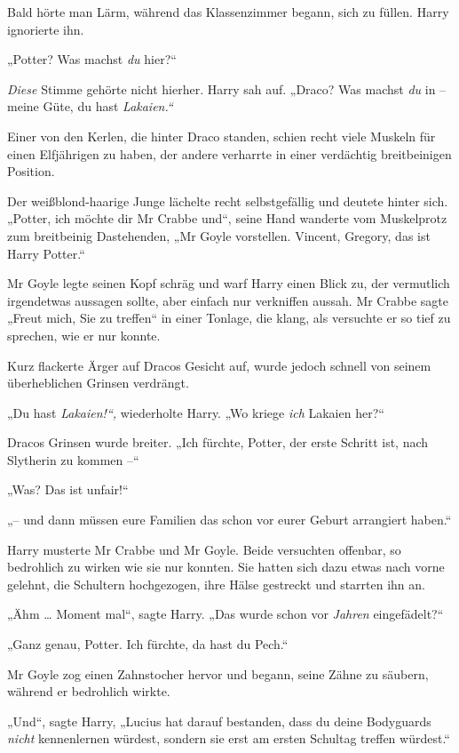 {Bald hörte man Lärm, während das Klassenzimmer begann, sich zu füllen. Harry ignorierte ihn.

„Potter? Was machst \emph{du} hier?“

\emph{Diese} Stimme gehörte nicht hierher. Harry sah auf. „Draco? Was machst \emph{du} in -- meine Güte, du hast \emph{Lakaien.“}

Einer von den Kerlen, die hinter Draco standen, schien recht viele Muskeln für einen Elfjährigen zu haben, der andere verharrte in einer verdächtig breitbeinigen Position.

Der weißblond-haarige Junge lächelte recht selbstgefällig und deutete hinter sich. „Potter, ich möchte dir Mr Crabbe und“, seine Hand wanderte vom Muskelprotz zum breitbeinig Dastehenden, „Mr Goyle vorstellen. Vincent, Gregory, das ist Harry Potter.“

Mr Goyle legte seinen Kopf schräg und warf Harry einen Blick zu, der vermutlich irgendetwas aussagen sollte, aber einfach nur verkniffen aussah. Mr Crabbe sagte „Freut mich, Sie zu treffen“ in einer Tonlage, die klang, als versuchte er so tief zu sprechen, wie er nur konnte.

Kurz flackerte Ärger auf Dracos Gesicht auf, wurde jedoch schnell von seinem überheblichen Grinsen verdrängt.

„Du hast \emph{Lakaien!“,} wiederholte Harry. „Wo kriege \emph{ich} Lakaien her?“

Dracos Grinsen wurde breiter. „Ich fürchte, Potter, der erste Schritt ist, nach Slytherin zu kommen --“

„Was? Das ist unfair!“

„-- und dann müssen eure Familien das schon vor eurer Geburt arrangiert haben.“

Harry musterte Mr Crabbe und Mr Goyle. Beide versuchten offenbar, so bedrohlich zu wirken wie sie nur konnten. Sie hatten sich dazu etwas nach vorne gelehnt, die Schultern hochgezogen, ihre Hälse gestreckt und starrten ihn an.

„Ähm … Moment mal“, sagte Harry. „Das wurde schon vor \emph{Jahren} eingefädelt?“

„Ganz genau, Potter. Ich fürchte, da hast du Pech.“

Mr Goyle zog einen Zahnstocher hervor und begann, seine Zähne zu säubern, während er bedrohlich wirkte.

„Und“, sagte Harry, „Lucius hat darauf bestanden, dass du deine Bodyguards \emph{nicht} kennenlernen würdest, sondern sie erst am ersten Schultag treffen würdest.“

}

